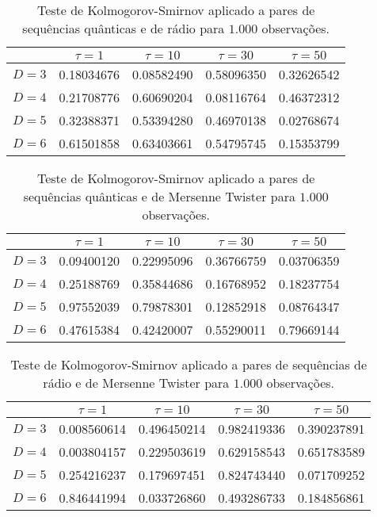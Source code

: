 \begin{table}[hbt]
\centering
\caption{Teste de Kolmogorov-Smirnov aplicado a pares de sequências quânticas e de rádio para $1.000$ observações.}\label{KS_Quantum_x_Radio_1k}
\begin{tabular}{c | c | c | c | c}
\toprule
  &    $\tau=1$   &   $\tau=10$   &   $\tau=30$   &   $\tau=50$   \\ \midrule
$D=3$ & 0.18034676 & 0.08582490 & 0.58096350 & 0.32626542 \\
$D=4$ & 0.21708776 & 0.60690204 & 0.08116764 & 0.46372312  \\
$D=5$ & 0.32388371 & 0.53394280 & 0.46970138 & 0.02768674  \\
$D=6$ & 0.61501858 & 0.63403661 & 0.54795745 & 0.15353799  \\ \bottomrule
\end{tabular}
\end{table}

\begin{table}[hbt]
	\centering
	\caption{Teste de Kolmogorov-Smirnov aplicado a pares de sequências quânticas e de Mersenne Twister para $1.000$ observações.}\label{KS_Quantum_x_MT_1k}
	\begin{tabular}{c | c | c | c | c}
		\toprule
		&    $\tau=1$   &   $\tau=10$   &   $\tau=30$   &   $\tau=50$   \\ \midrule
		$D=3$ & 0.09400120 & 0.22995096 & 0.36766759 &  0.03706359 \\
		$D=4$ & 0.25188769 & 0.35844686 & 0.16768952 &  0.18237754 \\
		$D=5$ & 0.97552039 & 0.79878301 & 0.12852918 &  0.08764347 \\
		$D=6$ & 0.47615384 & 0.42420007 & 0.55290011 &  0.79669144 \\
		\bottomrule
	\end{tabular}
\end{table}

\begin{table}[hbt]
	\centering
	\caption{Teste de Kolmogorov-Smirnov aplicado a pares de sequências de rádio e de Mersenne Twister para $1.000$ observações.}\label{KS_Radio_x_MT_1k}
	\begin{tabular}{c | c | c | c | c}
		\toprule
		&    $\tau=1$   &   $\tau=10$   &   $\tau=30$   &   $\tau=50$   \\ \midrule
		$D=3$ & 0.008560614 & 0.496450214 & 0.982419336 & 0.390237891 \\
		$D=4$ & 0.003804157 & 0.229503619 & 0.629158543 & 0.651783589 \\
		$D=5$ & 0.254216237 & 0.179697451 & 0.824743440 & 0.071709252 \\
		$D=6$ & 0.846441994 & 0.033726860 & 0.493286733 & 0.184856861 \\
		\bottomrule
	\end{tabular}
\end{table}

